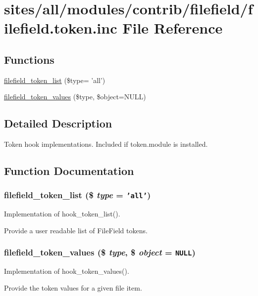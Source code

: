 \hypertarget{filefield_8token_8inc}{
\section{sites/all/modules/contrib/filefield/filefield.token.inc File Reference}
\label{filefield_8token_8inc}
}
\subsection*{Functions}
\begin{CompactItemize}
\item 
\hyperlink{filefield_8token_8inc_5bc370420aeaa6288183769fbeaa7453}{filefield\_\-token\_\-list} (\$type= 'all')
\item 
\hyperlink{filefield_8token_8inc_3764ee4fa099c95186719a2160e3bedb}{filefield\_\-token\_\-values} (\$type, \$object=NULL)
\end{CompactItemize}


\subsection{Detailed Description}
Token hook implementations. Included if token.module is installed. 

\subsection{Function Documentation}
\hypertarget{filefield_8token_8inc_5bc370420aeaa6288183769fbeaa7453}{
\subsubsection[{filefield\_\-token\_\-list}]{\setlength{\rightskip}{0pt plus 5cm}filefield\_\-token\_\-list (\$ {\em type} = {\tt 'all'})}}
\label{filefield_8token_8inc_5bc370420aeaa6288183769fbeaa7453}


Implementation of hook\_\-token\_\-list().

Provide a user readable list of FileField tokens. \hypertarget{filefield_8token_8inc_3764ee4fa099c95186719a2160e3bedb}{
\subsubsection[{filefield\_\-token\_\-values}]{\setlength{\rightskip}{0pt plus 5cm}filefield\_\-token\_\-values (\$ {\em type}, \/  \$ {\em object} = {\tt NULL})}}
\label{filefield_8token_8inc_3764ee4fa099c95186719a2160e3bedb}


Implementation of hook\_\-token\_\-values().

Provide the token values for a given file item. 